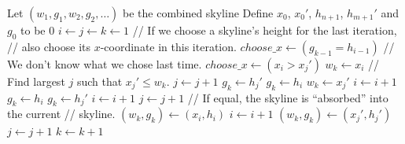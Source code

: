 \documentclass{article}
\begin{document}
\begin{enumerate}
\begin{enumerate}[label=\alph*)]
        \begin{algorithmic}[1]
            \State Let $(w_1, g_1, w_2, g_2, \dots)$ be the combined skyline
            \State Define $x_0$, $x_0'$, $h_{n + 1}$, $h_{m + 1}'$ and $g_0$ to be 0
            \State $i \gets j \gets k \gets 1$
            \Repeat
                        \State // If we choose a skyline's height for the last iteration,
                        \State // also choose its $x$-coordinate in this iteration.
                        \State $choose\_x \gets (g_{k - 1} = h_{i - 1})$
                    \Else
                        \State // We don't know what we chose last time.
                        \State $choose\_x \gets (x_i > x_j')$
                    \EndIf
                        \State $w_k \gets x_i$
                        \State // Find largest $j$ such that $x_j' \le w_k$.
                            \State $j \gets j + 1$
                        \EndWhile
                            \State $g_k \gets h_j'$
                        \Else
                            \State $g_k \gets h_i$
                        \EndIf
                    \Else
                        \State $w_k \gets x_j'$
                            \State $i \gets i + 1$
                        \EndWhile
                            \State $g_k \gets h_i$
                        \Else
                            \State $g_k \gets h_j'$
                        \EndIf
                    \EndIf
                    \State $i \gets i + 1$
                    \State $j \gets j + 1$
                \Else
                        \State // If equal, the skyline is ``absorbed'' into the current
                        \State // skyline.
                            \State $(w_k, g_k) \gets (x_i, h_i)$
                        \EndIf
                        \State $i \gets i + 1$
                    \Else
                            \State $(w_k, g_k) \gets (x_j', h_j')$
                        \EndIf
                        \State $j \gets j + 1$
                    \EndIf
                \EndIf
                \State $k \gets k + 1$

\end{algorithmic}
\end{enumerate}
\end{enumerate}
\end{document}
